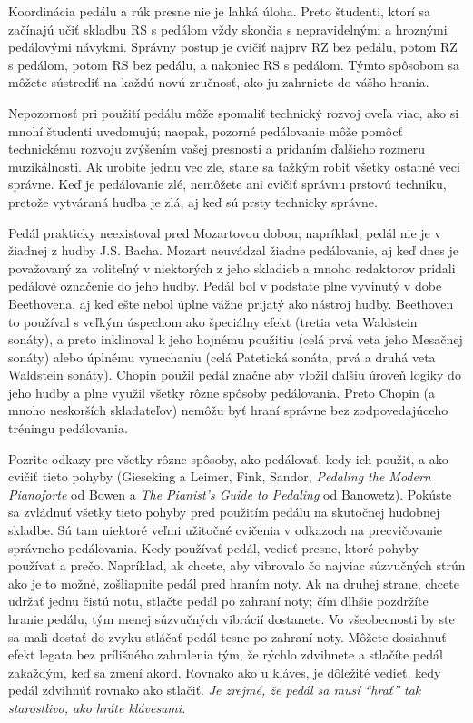 Koordinácia pedálu a rúk presne nie je ľahká úloha. Preto študenti, ktorí sa začínajú učiť skladbu RS s pedálom vždy skončia s nepravidelnými a hroznými pedálovými návykmi. Správny postup je cvičiť najprv RZ bez pedálu, potom RZ s pedálom, potom RS bez pedálu, a nakoniec RS s pedálom. Týmto spôsobom sa môžete sústrediť na každú novú zručnosť, ako ju zahrniete do vášho hrania.

Nepozornosť pri použití pedálu môže spomaliť technický rozvoj oveľa viac, ako si mnohí študenti uvedomujú; naopak, pozorné pedálovanie môže pomôcť technickému rozvoju zvýšením vašej presnosti a pridaním ďalšieho rozmeru muzikálnosti. Ak urobíte jednu vec zle, stane sa ťažkým robiť všetky ostatné veci správne. Keď je pedálovanie zlé, nemôžete ani cvičiť správnu prstovú techniku, pretože vytváraná hudba je zlá, aj keď sú prsty technicky správne.

Pedál prakticky neexistoval pred Mozartovou dobou; napríklad, pedál nie je v žiadnej z hudby J.S. Bacha. Mozart neuvádzal žiadne pedálovanie, aj keď dnes je považovaný za voliteľný v niektorých z jeho skladieb a mnoho redaktorov pridali pedálové označenie do jeho hudby. Pedál bol v podstate plne vyvinutý v dobe Beethovena, aj keď ešte nebol úplne vážne prijatý ako nástroj hudby. Beethoven to používal s veľkým úspechom ako špeciálny efekt (tretia veta Waldstein sonáty), a preto inklinoval k jeho hojnému použitiu (celá prvá veta jeho Mesačnej sonáty) alebo úplnému vynechaniu (celá Patetická sonáta, prvá a druhá veta Waldstein sonáty). Chopin použil pedál značne aby vložil ďalšiu úroveň logiky do jeho hudby a plne využil všetky rôzne spôsoby pedálovania. Preto Chopin (a mnoho neskorších skladateľov) nemôžu byť hraní správne bez zodpovedajúceho tréningu pedálovania.

Pozrite odkazy pre všetky rôzne spôsoby, ako pedálovať, kedy ich použiť, a ako cvičiť tieto pohyby (Gieseking a Leimer, Fink, Sandor, \textit{Pedaling the Modern Pianoforte} od Bowen a \emph{The Pianist’s Guide to Pedaling} od Banowetz). Pokúste sa zvládnuť všetky tieto pohyby pred použitím pedálu na skutočnej hudobnej skladbe. Sú tam niektoré veľmi užitočné cvičenia v odkazoch na precvičovanie správneho pedálovania. Kedy používať pedál, vedieť presne, ktoré pohyby používať a prečo. Napríklad, ak chcete, aby vibrovalo čo najviac súzvučných strún ako je to možné, zošliapnite pedál pred hraním noty. Ak na druhej strane, chcete udržať jednu čistú notu, stlačte pedál po zahraní noty; čím dlhšie pozdržíte hranie pedálu, tým menej súzvučných vibrácií dostanete. Vo všeobecnosti by ste  sa mali dostať do zvyku stláčať pedál tesne po zahraní noty. Môžete dosiahnuť efekt legata bez prílišného zahmlenia tým, že rýchlo zdvihnete a stlačíte pedál zakaždým, keď sa zmení akord. Rovnako ako u kláves, je dôležité vedieť, kedy pedál zdvihnúť rovnako ako stlačiť. \emph{Je zrejmé, že pedál sa musí “hrať” tak starostlivo, ako hráte klávesami.}

